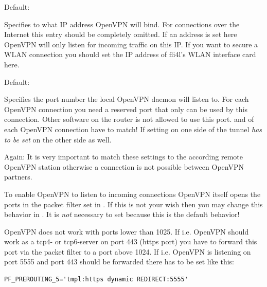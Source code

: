\begin{description}

  Default: 

  Specifies to what IP address OpenVPN will bind. For connections over the 
  Internet this entry should be completely omitted. If an address is set here 
  OpenVPN will only listen for incoming traffic on this IP. If you want to 
  secure a WLAN connection you should set the IP address of fli4l's WLAN 
  interface card here.


  Default: 

  Specifies the port number the local OpenVPN daemon will listen to.
  For each OpenVPN connection you need a reserved port that only can 
  be used by this connection. Other software on the router is not 
  allowed to use this port.  and 
   of each OpenVPN connection have to match! 
  If setting  on one side of the tunnel 
   \emph{has to be set} on the other 
  side as well.
  
  Again: It is very important to match these settings to the according 
  remote OpenVPN station otherwise a connection is not possible between 
  OpenVPN partners.

  To enable OpenVPN to listen to incoming connections OpenVPN itself opens the 
  ports in the packet filter set in . If this is 
  not your wish then you may change this behavior in 
  . 
  It is \emph{not} necessary to set  
  because this is the default behavior!

  OpenVPN does not work with ports lower than 1025. If i.e. OpenVPN should 
  work as a tcp4- or tcp6-server on port 443 (https port) you have to forward this 
  port via the packet filter to a port above 1024. If i.e. OpenVPN is 
  listening on port 5555 and port 443 should be forwarded there 
   has to be set like this:

\begin{example}
\begin{verbatim}
PF_PREROUTING_5='tmpl:https dynamic REDIRECT:5555'
\end{verbatim}
\end{example}


\end{description}
